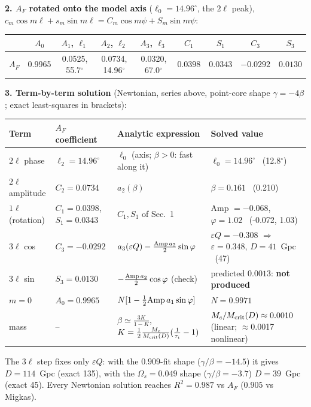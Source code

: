 \documentclass[10pt]{article}
\begin{document}
{\textbf{2. $A_F$ rotated onto the model axis} ($\ell_0=14.96^\circ$, the $2\ell$ peak), $c_m\cos m\ell+s_m\sin m\ell=C_m\cos m\psi+S_m\sin m\psi$:
\begin{center}\begin{tabular}{lcccccccc}\toprule
 & $A_0$ & $A_1$, $\ell_1$ & $A_2$, $\ell_2$ & $A_3$, $\ell_3$ & $C_1$ & $S_1$ & $C_3$ & $S_3$\\\midrule
$A_F$ & 0.9965 & 0.0525, 55.7$^\circ$ & 0.0734, 14.96$^\circ$ & 0.0320, 67.0$^\circ$ & $0.0398$ & $0.0343$ & $-0.0292$ & $0.0130$\\\bottomrule
\end{tabular}\end{center}
\vspace{-4pt}
\textbf{3. Term-by-term solution} (Newtonian, series above, point-core shape $\gamma=-4\beta$; exact least-squares in brackets):
\begin{center}\footnotesize\setlength{\tabcolsep}{3pt}\begin{tabular}{llll}\toprule
Term & $A_F$ coefficient & Analytic expression & Solved value\\\midrule
$2\ell$ phase & $\ell_2=14.96^\circ$ & $\ell_0$ (axis; $\beta>0$: fast along it) & $\ell_0=14.96^\circ$ \ (12.8$^\circ$)\\
$2\ell$ amplitude & $C_2=0.0734$ & $a_2(\beta)$ & $\beta=0.161$ \ (0.210)\\
$1\ell$ (rotation) & $C_1=0.0398$, $S_1=0.0343$ & $C_1,S_1$ of Sec.~1 & Amp $=-0.068$, $\varphi=1.02$ \ (-0.072, 1.03)\\
$3\ell$ cos & $C_3=-0.0292$ & $a_3(\varepsilon Q)-\frac{{\rm Amp}\,a_2}2\sin\varphi$ & $\varepsilon Q=-0.308$ $\Rightarrow$ $\varepsilon=0.348$, $D=41$~Gpc \ (47)\\
$3\ell$ sin & $S_3=0.0130$ & $-\frac{{\rm Amp}\,a_2}2\cos\varphi$ (check) & predicted $0.0013$: \textbf{not produced}\\
$m=0$ & $A_0=0.9965$ & $N[1-\frac12{\rm Amp}\,a_1\sin\varphi]$ & $N=0.9971$\\\midrule
mass & -- & $\beta\simeq\frac{3K}{1-K}$, $K=\frac12\frac{M_c}{M_{\rm crit}(D)}(\frac1{\tau_i}-1)$ & $M_c/M_{\rm crit}(D)\approx0.0010$ (linear; $\approx$0.0017 nonlinear)\\\bottomrule
\end{tabular}\end{center}
\vspace{-4pt}
The $3\ell$ step fixes only $\varepsilon Q$: with the $0.909$-fit shape ($\gamma/\beta=-14.5$) it gives $D=114$~Gpc (exact 135), with the $\Omega_s=0.049$ shape ($\gamma/\beta=-3.7$) $D=39$~Gpc (exact 45). Every Newtonian solution reaches $R^2=0.987$ vs $A_F$ ($0.905$ vs Migkas).

}
\end{document}
